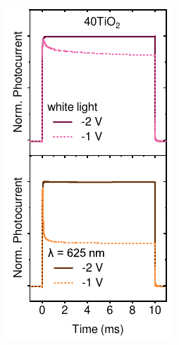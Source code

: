\begin{figure}[htbp]
    \centering
    \begin{subfigure}{0.245\textwidth}
        \centering
        \includegraphics[width=\textwidth]{chapters/transport_layers/images/TPC_40TiO2.pdf}

\end{subfigure}
\end{figure}
